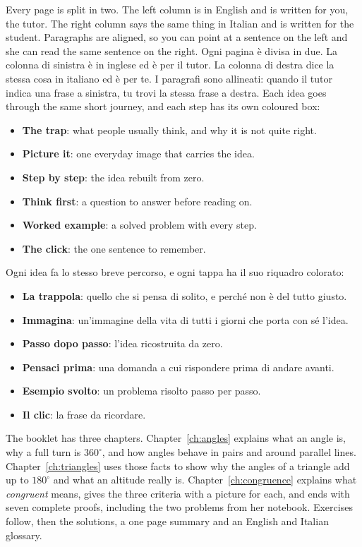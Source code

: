 \begin{bi}
\colheads
Every page is split in two. The left column is in English and is written for you, the tutor. The right column says the same thing in Italian and is written for the student. Paragraphs are aligned, so you can point at a sentence on the left and she can read the same sentence on the right.
\IT
Ogni pagina è divisa in due. La colonna di sinistra è in inglese ed è per il tutor. La colonna di destra dice la stessa cosa in italiano ed è per te. I paragrafi sono allineati: quando il tutor indica una frase a sinistra, tu trovi la stessa frase a destra.
\EN
Each idea goes through the same short journey, and each step has its own coloured box:
\begin{itemize}
  \item \textbf{\color{slate}The trap}: what people usually think, and why it is not quite right.
  \item \textbf{\color{forest}Picture it}: one everyday image that carries the idea.
  \item \textbf{\color{navy}Step by step}: the idea rebuilt from zero.
  \item \textbf{\color{deeporange}Think first}: a question to answer before reading on.
  \item \textbf{\color{deeppurple}Worked example}: a solved problem with every step.
  \item \textbf{\color{crimson}The click}: the one sentence to remember.
\end{itemize}
\IT
Ogni idea fa lo stesso breve percorso, e ogni tappa ha il suo riquadro colorato:
\begin{itemize}
  \item \textbf{\color{slate}La trappola}: quello che si pensa di solito, e perché non è del tutto giusto.
  \item \textbf{\color{forest}Immagina}: un'immagine della vita di tutti i giorni che porta con sé l'idea.
  \item \textbf{\color{navy}Passo dopo passo}: l'idea ricostruita da zero.
  \item \textbf{\color{deeporange}Pensaci prima}: una domanda a cui rispondere prima di andare avanti.
  \item \textbf{\color{deeppurple}Esempio svolto}: un problema risolto passo per passo.
  \item \textbf{\color{crimson}Il clic}: la frase da ricordare.
\end{itemize}
\EN
The booklet has three chapters. Chapter~\ref{ch:angles} explains what an angle is, why a full turn is $360^\circ$, and how angles behave in pairs and around parallel lines. Chapter~\ref{ch:triangles} uses those facts to show why the angles of a triangle add up to $180^\circ$ and what an altitude really is. Chapter~\ref{ch:congruence} explains what \emph{congruent} means, gives the three criteria with a picture for each, and ends with seven complete proofs, including the two problems from her notebook. Exercises follow, then the solutions, a one page summary and an English and Italian glossary.

\end{bi}
